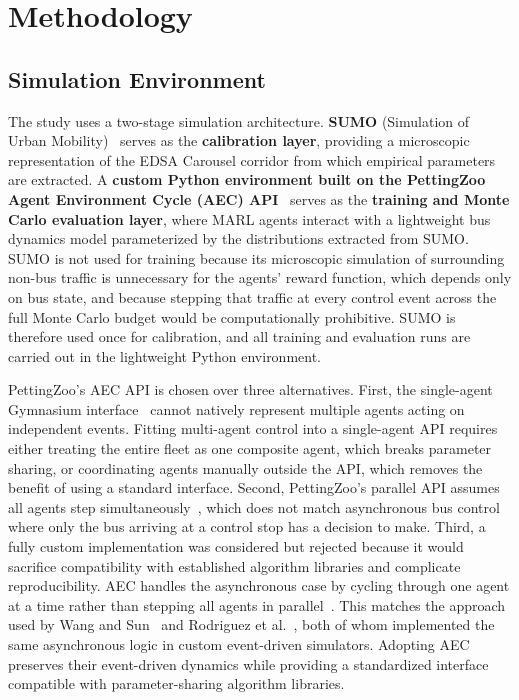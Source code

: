 \section{Methodology}

\subsection{Simulation Environment}

The study uses a two-stage simulation architecture. \textbf{SUMO} (Simulation of Urban Mobility)~\cite{Lopez2018SUMO} serves as the \textbf{calibration layer}, providing a microscopic representation of the EDSA Carousel corridor from which empirical parameters are extracted. A \textbf{custom Python environment built on the PettingZoo Agent Environment Cycle (AEC) API}~\cite{Terry2021PettingZoo} serves as the \textbf{training and Monte Carlo evaluation layer}, where MARL agents interact with a lightweight bus dynamics model parameterized by the distributions extracted from SUMO. SUMO is not used for training because its microscopic simulation of surrounding non-bus traffic is unnecessary for the agents' reward function, which depends only on bus state, and because stepping that traffic at every control event across the full Monte Carlo budget would be computationally prohibitive. SUMO is therefore used once for calibration, and all training and evaluation runs are carried out in the lightweight Python environment.

PettingZoo's AEC API is chosen over three alternatives. First, the single-agent Gymnasium interface~\cite{Towers2024Gymnasium} cannot natively represent multiple agents acting on independent events. Fitting multi-agent control into a single-agent API requires either treating the entire fleet as one composite agent, which breaks parameter sharing, or coordinating agents manually outside the API, which removes the benefit of using a standard interface. Second, PettingZoo's parallel API assumes all agents step simultaneously~\cite{Terry2021PettingZoo}, which does not match asynchronous bus control where only the bus arriving at a control stop has a decision to make. Third, a fully custom implementation was considered but rejected because it would sacrifice compatibility with established algorithm libraries and complicate reproducibility. AEC handles the asynchronous case by cycling through one agent at a time rather than stepping all agents in parallel~\cite{Terry2021PettingZoo}. This matches the approach used by Wang and Sun~\cite{Wangsun} and Rodriguez et al.~\cite{Rodriguez2023Cooperative}, both of whom implemented the same asynchronous logic in custom event-driven simulators. Adopting AEC preserves their event-driven dynamics while providing a standardized interface compatible with parameter-sharing algorithm libraries.

